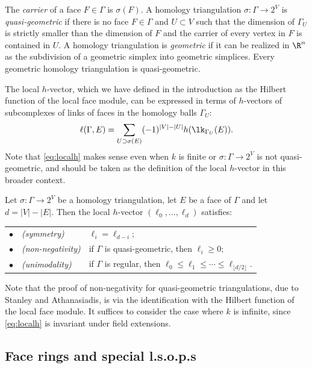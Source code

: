 The \emph{carrier} of a face $F \in \Gamma$ is $\sigma(F)$. A homology triangulation $\sigma\colon \Gamma \to 2^V$ is \emph{quasi-geometric} if there is no face $F \in \Gamma$ and $U \subset V$ such that the dimension of $\Gamma_U$ is strictly smaller than the dimension of $F$ and the carrier of every vertex in $F$ is contained in $U$.  A homology triangulation is \emph{geometric} if it can be realized in $\R^n$ as the subdivision of a geometric simplex into geometric simplices. Every geometric homology triangulation is quasi-geometric. 

The local $h$-vector, which we have defined in the introduction as the Hilbert function of the local face module, can be expressed in terms of $h$-vectors of subcomplexes of links of faces in the homology balls $\Gamma_U$:
\begin{equation} \label{eq:localh}
\ell(\Gamma, E) = \sum_{U \supset \sigma(E)} (-1)^{|V| - \vert U \vert} h(\lk_{\Gamma_U}(E)).
\end{equation}
Note that \eqref{eq:localh} makes sense even when $k$ is finite or $\sigma \colon \Gamma \to 2^V$ is not quasi-geometric, and should be taken as the definition of the local $h$-vector in this broader context. 


\begin{theorem}\label{t:localproperties}
Let $\sigma \colon \Gamma \to 2^V$ be a homology triangulation, let $E$ be a face of $\Gamma$ and let $d = |V| - |E|$.  Then the local $h$-vector $(\ell_0, \ldots, \ell_d)$ satisfies: \\
\begin{tabular}{lll}
\quad \quad $\bullet$ &  \emph{(symmetry)} &
$\ell_i = \ell_{d-i};$ \\
\quad \quad $\bullet$ & \emph{(non-negativity)} & if $\Gamma$ is quasi-geometric, then $\ell_i \geq 0;$\\
\quad \quad $\bullet$ & \emph{(unimodality)} &
 if $\Gamma$ is regular, then $\ell_0 \leq \ell_1 \leq \cdots \leq \ell_{\lfloor d/2 \rfloor}$.
\end{tabular}
\end{theorem}

Note that the proof of non-negativity for quasi-geometric triangulations, due to Stanley and Athanasiadis, is via the identification with the Hilbert function of the local face module. It suffices to consider the case where $k$ is infinite, since \eqref{eq:localh} is invariant under field extensions.


\subsection{Face rings and special l.s.o.p.s}\label{ss:sr}

